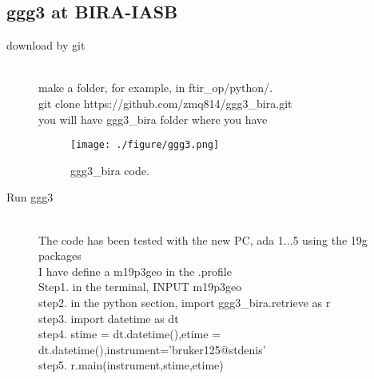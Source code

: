 \documentclass{article}
\begin{document}
\subsection{ggg3 at BIRA-IASB }
\label{download by git}
\begin{description}
\item[download by git]\hfill \\
make a folder, for example, in ftir\_op/python/. \\
git clone https://github.com/zmq814/ggg3\_bira.git \\
you will have ggg3\_bira folder where you have \\
\begin{figure}[h]
\begin{center}
\texttt{[image: ./figure/ggg3.png]} 
\caption{ggg3\_bira code.}
\end{center}
\end{figure}
\item[Run ggg3] \hfill \\
The code has been tested with the new PC, ada 1...5 using the 19g packages \\
I have define a m19p3geo in the .profile\\
Step1. in the terminal, INPUT m19p3geo \\
step2. in the python section, import ggg3\_bira.retrieve as r\\
step3. import datetime as dt\\
step4. stime = dt.datetime(),etime = dt.datetime(),instrument='bruker125@stdenis'\\
step5. r.main(instrument,stime,etime)\\

\end{description} 
 
\end{document}
